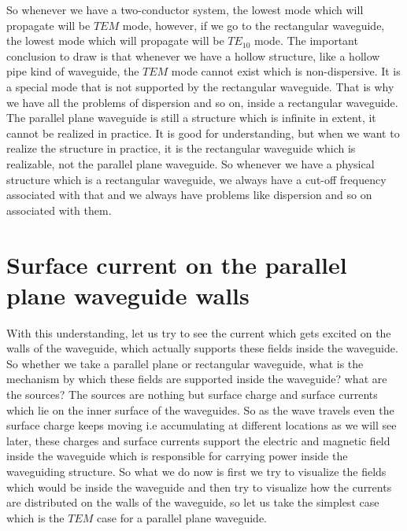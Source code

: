 So whenever we have a two-conductor system, the lowest mode which will propagate will be $TEM$ mode, however, if we go to the rectangular waveguide, the lowest mode which will propagate will be ${TE_{10}}$ mode. The important conclusion to draw is that whenever we have a hollow structure, like a hollow pipe kind of waveguide, the $TEM$ mode cannot exist which is non-dispersive. It is a special mode that is not supported by the rectangular waveguide. That is why we have all the problems of dispersion and so on, inside a rectangular waveguide. The parallel plane waveguide is still a structure which is infinite in extent, it cannot be realized in practice. It is good for understanding, but when we want to realize the structure in practice, it is the rectangular waveguide which is realizable, not the parallel plane waveguide. So whenever we have a physical structure which is a rectangular waveguide, we always have a cut-off frequency associated with that and we always have problems like dispersion and so on associated with them.

\section{Surface current on the parallel plane waveguide walls}
With this understanding, let us try to see the current which gets excited on the walls of the waveguide, which actually supports these fields inside the waveguide. So whether we take a parallel plane or rectangular waveguide, what is the mechanism by which these fields are supported inside the waveguide? what are the sources? The sources are nothing but surface charge and surface currents which lie on the inner surface of the waveguides. So as the wave travels even the surface charge keeps moving i.e accumulating at different locations as we will see later, these charges and surface currents support the electric and magnetic field inside the waveguide which is responsible for carrying power inside the waveguiding structure. So what we do now is first we try to visualize the fields which would be inside the waveguide and then try to visualize how the currents are distributed on the walls of the waveguide, so let us take the simplest case which is the $TEM$ case for a parallel plane waveguide.

